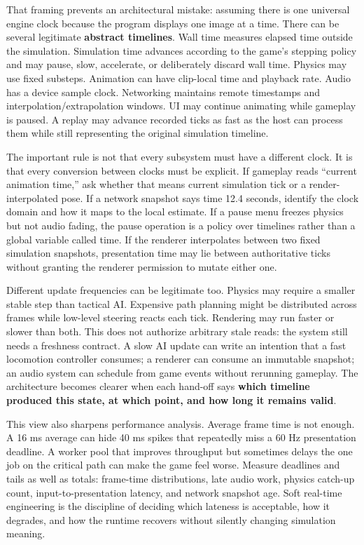 That framing prevents an architectural mistake: assuming there is one universal engine clock because the program displays one image at a time. There can be several legitimate \textbf{abstract timelines}. Wall time measures elapsed time outside the simulation. Simulation time advances according to the game's stepping policy and may pause, slow, accelerate, or deliberately discard wall time. Physics may use fixed substeps. Animation can have clip-local time and playback rate. Audio has a device sample clock. Networking maintains remote timestamps and interpolation/extrapolation windows. UI may continue animating while gameplay is paused. A replay may advance recorded ticks as fast as the host can process them while still representing the original simulation timeline.

The important rule is not that every subsystem must have a different clock. It is that every conversion between clocks must be explicit. If gameplay reads ``current animation time,'' ask whether that means current simulation tick or a render-interpolated pose. If a network snapshot says time 12.4 seconds, identify the clock domain and how it maps to the local estimate. If a pause menu freezes physics but not audio fading, the pause operation is a policy over timelines rather than a global variable called time. If the renderer interpolates between two fixed simulation snapshots, presentation time may lie between authoritative ticks without granting the renderer permission to mutate either one.

Different update frequencies can be legitimate too. Physics may require a smaller stable step than tactical AI. Expensive path planning might be distributed across frames while low-level steering reacts each tick. Rendering may run faster or slower than both. This does not authorize arbitrary stale reads: the system still needs a freshness contract. A slow AI update can write an intention that a fast locomotion controller consumes; a renderer can consume an immutable snapshot; an audio system can schedule from game events without rerunning gameplay. The architecture becomes clearer when each hand-off says \textbf{which timeline produced this state, at which point, and how long it remains valid}.

This view also sharpens performance analysis. Average frame time is not enough. A 16 ms average can hide 40 ms spikes that repeatedly miss a 60 Hz presentation deadline. A worker pool that improves throughput but sometimes delays the one job on the critical path can make the game feel worse. Measure deadlines and tails as well as totals: frame-time distributions, late audio work, physics catch-up count, input-to-presentation latency, and network snapshot age. Soft real-time engineering is the discipline of deciding which lateness is acceptable, how it degrades, and how the runtime recovers without silently changing simulation meaning.

